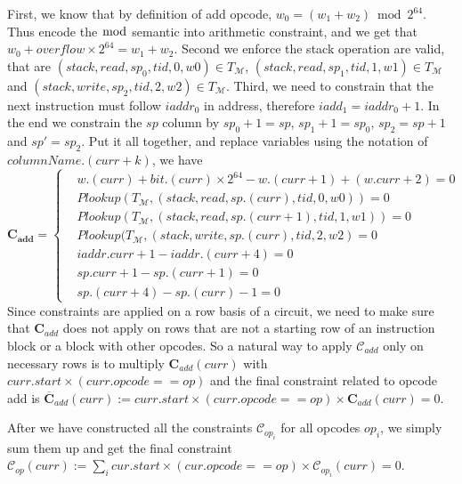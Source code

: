 First, we know that by definition of add opcode, $w_0 = (w_1+w_2) \bmod 2^{64}$. Thus encode the $\bmod$ semantic into arithmetic constraint, and we get that $w_0 + overflow \times 2^{64}= w_1 + w_2$. Second we enforce the stack operation are valid, that are $(stack, read, sp_0, tid, 0, w0) \in T_\mathcal{M}$, $(stack, read, sp_1, tid, 1, w1) \in T_\mathcal{M}$ and $(stack, write, sp_2, tid, 2, w2) \in T_\mathcal{M}$. Third, we need to constrain that the next instruction must follow $iaddr_0$ in address, therefore $iadd_1 = iaddr_0 + 1$. In the end we constrain the $sp$ column by $sp_0 + 1= sp$, $sp_1 + 1= sp_0$, $sp_2 = sp+1$ and $sp' = sp_2$. Put it all together, and replace variables using the notation of $columnName.(curr + k)$, we have
\[
    \mathbf{C_{add}} = \begin{cases}
        &w.(curr) + bit.(curr) \times 2^{64} - w.(curr+1) + (w.curr + 2) = 0 \\
        &Plookup(T_\mathcal{M}, (stack, read, sp.(curr), tid, 0, w0)) = 0 \\
        &Plookup(T_\mathcal{M}, (stack, read, sp.(curr+1), tid, 1, w1)) = 0 \\
        &Plookup(T_\mathcal{M}, (stack, write, sp.(curr), tid, 2, w2) = 0 \\
        &iaddr.curr + 1 - iaddr.(curr + 4) = 0\\
        &sp.curr + 1 - sp.(curr+1) = 0\\
        &sp.(curr+4) - sp.(curr) - 1 = 0
    \end{cases}
\]
Since constraints are applied on a row basis of a circuit, we need to make sure that $\mathbf{C}_{add}$ does not apply on rows that are not a starting row of an instruction block or a block with other opcodes. So a natural way to apply $\mathcal{C}_{add}$ only on necessary rows is to multiply $\mathbf{C}_{add}(curr)$ with $curr.start \times (curr.opcode == op)$ and the final constraint related to opcode add is $\overline{\mathbf{C}}_{add}(curr) := curr.start \times (curr.opcode == op) \times \mathbf{C}_{add}(curr) = 0$.

After we have constructed all the constraints $\mathcal{C}_{op_i}$ for all opcodes $op_i$, we simply sum them up and get the final constraint $\mathcal{C}_{op}(curr) := \sum_i cur.start \times (cur.opcode == op) \times \mathcal{C}_{op_i}(curr) = 0$.

